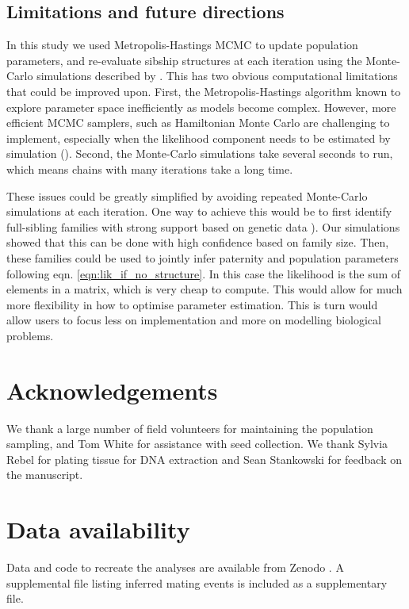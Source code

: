 \documentclass[10pt, a4paper, twocolumn]{article} %
\begin{document}
\subsection{Limitations and future directions}

In this study we used Metropolis-Hastings MCMC to update population parameters, and re-evaluate sibship structures at each iteration using the Monte-Carlo simulations described by \textcite{ellis2018efficient}.
This has two obvious computational limitations that could be improved upon.
First, the Metropolis-Hastings algorithm known to explore parameter space inefficiently as models become complex.
However, more efficient MCMC samplers, such as Hamiltonian Monte Carlo are challenging to implement, especially when the likelihood component needs to be estimated by simulation (\cite{betancourt2017conceptual}).
Second, the Monte-Carlo simulations take several seconds to run, which means chains with many iterations take a long time.

These issues could be greatly simplified by avoiding repeated Monte-Carlo simulations at each iteration.
One way to achieve this would be to first identify full-sibling families with strong support based on genetic data \cite{ellis2018efficient}).
Our simulations showed that this can be done with high confidence based on family size.
Then, these families could be used to jointly infer paternity and population parameters following eqn. \ref{eqn:lik_if_no_structure}.
In this case the likelihood is the sum of elements in a matrix, which is very cheap to compute.
This would allow for much more flexibility in how to optimise parameter estimation.
This is turn would allow users to focus less on implementation and more on modelling biological problems.


\section{Acknowledgements}

We thank a large number of field volunteers for maintaining the population sampling, and Tom White for assistance with seed collection. We thank Sylvia Rebel for plating tissue for DNA extraction and Sean Stankowski for feedback on the manuscript.

\section{Data availability}

Data and code to recreate the analyses are available from Zenodo \citep{tom_ellis_2024_10565078}. A supplemental file listing inferred mating events is included as a supplementary file.
\end{document}
